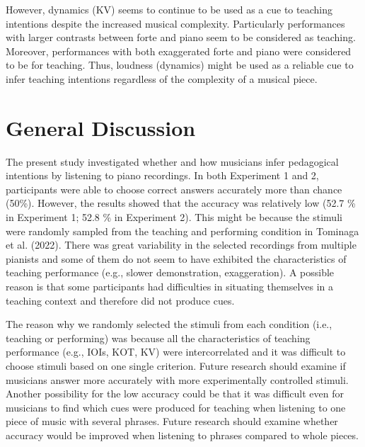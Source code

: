 \documentclass[
  man,floatsintext]{apa6}
\begin{document}
However, dynamics (KV) seems to continue to be used as a cue to teaching intentions despite the increased musical complexity. Particularly performances with larger contrasts between forte and piano seem to be considered as teaching. Moreover, performances with both exaggerated forte and piano were considered to be for teaching. Thus, loudness (dynamics) might be used as a reliable cue to infer teaching intentions regardless of the complexity of a musical piece.

\hypertarget{general-discussion}{%
\section{General Discussion}\label{general-discussion}}

The present study investigated whether and how musicians infer pedagogical intentions by listening to piano recordings. In both Experiment 1 and 2, participants were able to choose correct answers accurately more than chance (50\%). However, the results showed that the accuracy was relatively low (52.7 \% in Experiment 1; 52.8 \% in Experiment 2). This might be because the stimuli were randomly sampled from the teaching and performing condition in Tominaga et al. (2022). There was great variability in the selected recordings from multiple pianists and some of them do not seem to have exhibited the characteristics of teaching performance (e.g., slower demonstration, exaggeration). A possible reason is that some participants had difficulties in situating themselves in a teaching context and therefore did not produce cues.

The reason why we randomly selected the stimuli from each condition (i.e., teaching or performing) was because all the characteristics of teaching performance (e.g., IOIs, KOT, KV) were intercorrelated and it was difficult to choose stimuli based on one single criterion. Future research should examine if musicians answer more accurately with more experimentally controlled stimuli. Another possibility for the low accuracy could be that it was difficult even for musicians to find which cues were produced for teaching when listening to one piece of music with several phrases. Future research should examine whether accuracy would be improved when listening to phrases compared to whole pieces.
\end{document}
